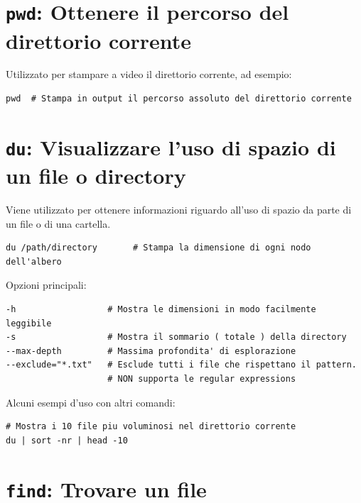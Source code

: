 \documentclass[a4paper]{report}
\newenvironment{info}{\begin{tcolorbox}[fonttitle=\sffamily\bfseries\large,title=Info,colframe=blue!75!white]}{\end{tcolorbox}}
\newenvironment{code}{\begin{tcolorbox}[size=small]}{\end{tcolorbox}}
\begin{document}
\section{\texttt{pwd}: Ottenere il percorso del direttorio corrente}

Utilizzato per stampare a video il direttorio corrente, ad esempio:

\begin{code}
\begin{lstlisting}
pwd  # Stampa in output il percorso assoluto del direttorio corrente
\end{lstlisting}
\end{code}

\section{\texttt{du}: Visualizzare l'uso di spazio di un file o directory}

Viene utilizzato per ottenere informazioni riguardo all'uso di spazio da parte di un file o di una cartella.

\begin{code}
\begin{lstlisting}
du /path/directory       # Stampa la dimensione di ogni nodo dell'albero
\end{lstlisting}

Opzioni principali:

\begin{lstlisting}
-h                  # Mostra le dimensioni in modo facilmente leggibile
-s                  # Mostra il sommario ( totale ) della directory
--max-depth         # Massima profondita' di esplorazione
--exclude="*.txt"   # Esclude tutti i file che rispettano il pattern. 
                    # NON supporta le regular expressions
\end{lstlisting}
\end{code}

\begin{info}
Alcuni esempi d'uso con altri comandi:

\begin{lstlisting}
# Mostra i 10 file piu voluminosi nel direttorio corrente
du | sort -nr | head -10
\end{lstlisting}
\end{info}

\section{\texttt{find}: Trovare un file}
\end{document}
